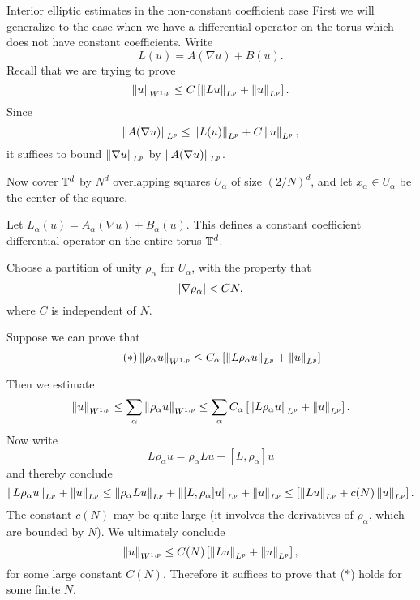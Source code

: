 \begin{clear}{Interior elliptic estimates in the non-constant
    coefficient case}  
First we will generalize to the case when we have a differential operator on the torus which does not have constant coefficients. Write
\begin{equation*}
  L(u)=A(\nabla u)+B(u).
\end{equation*}
Recall that we are trying to prove
\begin{equation*}
  \left\lVert u\right\rVert_{W^{1,p}}\le C\left[\left\lVert Lu\right\rVert_{L^{p}}+\left\lVert u\right\rVert_{L^{p}}\right].
\end{equation*}
Since
\begin{equation*}
  \left\lVert A(\nabla u)\right\rVert_{L^{p}}\le \left\lVert L(u)\right\rVert_{L^{p}}+C\left\lVert u\right\rVert_{L^{p}},
\end{equation*}
it suffices to bound $\left\lVert\nabla u\right\rVert_{L^{p}}$ by $\left\lVert A(\nabla u)\right\rVert_{L^{p}}$.

Now cover $\mathbb{T}^{d}$ by $N^{d}$ overlapping squares $U_{\alpha}$ of size $(2/N)^{d}$, and let $x_{\alpha}\in U_{\alpha}$ be the center of the square.

Let $L_{\alpha}(u)=A_{\alpha}(\nabla u)+B_{\alpha}(u)$. This defines a constant coefficient differential operator on the entire torus $\mathbb{T}^{d}$.

Choose a partition of unity $\rho_{\alpha}$ for $U_{\alpha}$, with the property that
\begin{equation*}
  \left|\nabla \rho_{\alpha}\right|<CN,
\end{equation*}
where $C$ is independent of $N$.

Suppose we can prove that
\begin{equation*}\tag{$\ast$}
  \left\lVert\rho_{\alpha}u\right\rVert_{W^{1,p}}\le C_{\alpha}\left[\left\lVert L\rho_{\alpha}u\right\rVert_{L^{p}}+\left\lVert u\right\rVert_{L^{p}}\right]
\end{equation*}

Then we estimate
\begin{equation*}
  \left\lVert u\right\rVert_{W^{1,p}}\le \sum_{\alpha}\left\lVert\rho_{\alpha}u\right\rVert_{W^{1,p}}\le \sum_{\alpha}C_{\alpha}\left[\left\lVert L\rho_{\alpha}u\right\rVert_{L^{p}}+\left\lVert u\right\rVert_{L^{p}}\right].
\end{equation*}
Now write
\begin{equation*}
  L\rho_{\alpha}u=\rho_{\alpha}Lu+[L,\rho_{\alpha}]u
\end{equation*}
and thereby conclude
\begin{equation*}
  \left\lVert L\rho_{\alpha}u\right\rVert_{L^{p}}+\left\lVert u\right\rVert_{L^{p}}\le \left\lVert\rho_{\alpha}Lu\right\rVert_{L^{p}}+\left\lVert[L,\rho_{\alpha}]u\right\rVert_{L^{p}}+\left\lVert u\right\rVert_{L^{p}}\le \left[\left\lVert Lu\right\rVert_{L^{p}}+c(N)\left\lVert u\right\rVert_{L^{p}}\right].
\end{equation*}
The constant $c(N)$ may be quite large (it involves the derivatives of $\rho_{\alpha}$, which are bounded by $N$). We ultimately conclude
\begin{equation*}
  \left\lVert u\right\rVert_{W^{1,p}}\le C(N) \left[\left\lVert Lu\right\rVert_{L^{p}}+\left\lVert u\right\rVert_{L^{p}}\right],
\end{equation*}
for some large constant $C(N)$. Therefore it suffices to prove that ($\ast$) holds for some finite $N$.


\end{clear}
